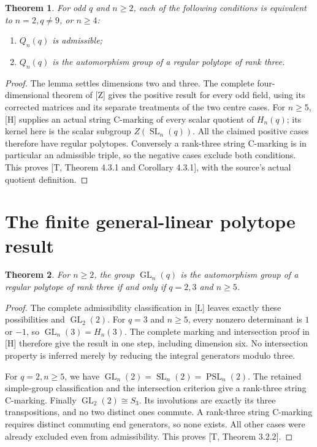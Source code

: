 \documentclass[11pt,a4paper]{article}
\newtheorem{theorem}{Theorem}
\newcommand{\GL}{\operatorname{GL}}
\newcommand{\SL}{\operatorname{SL}}
\newcommand{\PSL}{\operatorname{PSL}}
\begin{document}
\begin{theorem}
For odd $q$ and $n\ge2$, each of the following conditions is equivalent
to $n=2,q\ne9$, or $n\ge4$:
\begin{enumerate}
\item $Q_n(q)$ is admissible;
\item $Q_n(q)$ is the automorphism group of a regular polytope of rank three.
\end{enumerate}
\end{theorem}
\begin{proof}
The lemma settles dimensions two and three. The complete
four-dimensional theorem of [Z] gives the positive result for every
odd field, using its corrected matrices and its separate treatments
of the two centre cases. For $n\ge5$, [H] supplies an actual string
C-marking of every scalar quotient of $H_n(q)$; its kernel here is
the scalar subgroup $Z(\SL_n(q))$. All the claimed positive cases
therefore have regular polytopes. Conversely a rank-three string
C-marking is in particular an admissible triple, so the negative
cases exclude both conditions. This proves [T, Theorem 4.3.1 and
Corollary 4.3.1], with the source's actual quotient definition.
\end{proof}

\section{The finite general-linear polytope result}
\begin{theorem}
For $n\ge2$, the group $\GL_n(q)$ is the automorphism group of a
regular polytope of rank three if and only if $q=2,3$ and $n\ge5$.
\end{theorem}
\begin{proof}
The complete admissibility classification in [L] leaves exactly
these possibilities and $\GL_2(2)$. For $q=3$ and $n\ge5$, every
nonzero determinant is $1$ or $-1$, so
$\GL_n(3)=H_n(3)$. The complete marking and intersection proof in
[H] therefore give the result in one step, including dimension six.
No intersection property is inferred merely by reducing the integral
generators modulo three.

For $q=2,n\ge5$, we have
$\GL_n(2)=\SL_n(2)=\PSL_n(2)$. The retained simple-group
classification and the intersection criterion give a rank-three
string C-marking. Finally $\GL_2(2)\cong S_3$. Its involutions
are exactly its three transpositions, and no two distinct ones
commute. A rank-three string C-marking requires distinct commuting
end generators, so none exists. All other cases were already
excluded even from admissibility. This proves [T, Theorem 3.2.2].
\end{proof}
\end{document}
